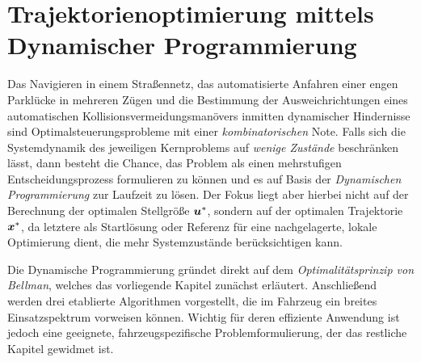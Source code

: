 
\chapter{Trajektorienoptimierung mittels Dynamischer Programmierung} \label{chap:dynamische_Optimierung_dynamisch}



Das Navigieren in einem Straßennetz, das automatisierte Anfahren einer engen Parklücke in mehreren Zügen und die Bestimmung der Ausweichrichtungen eines automatischen Kollisionsvermeidungsmanövers inmitten dynamischer Hindernisse sind Optimalsteuerungsprobleme mit einer \emph{kombinatorischen} Note. Falls sich die Systemdynamik des jeweiligen Kernproblems auf \emph{wenige Zustände} beschränken lässt, dann besteht die Chance, das Problem als einen mehrstufigen Entscheidungsprozess formulieren zu können und es auf Basis der \emph{Dynamischen Programmierung} zur Laufzeit zu lösen. Der Fokus liegt aber hierbei \iA nicht auf der Berechnung der optimalen Stellgröße $\boldsymbol{u}^\ast$, sondern auf der optimalen Trajektorie $\boldsymbol{x}^\ast$, da letztere als Startlösung oder Referenz für eine nachgelagerte, lokale Optimierung dient, die mehr Systemzustände berücksichtigen kann.

Die Dynamische Programmierung gründet direkt auf dem \emph{Optimalitätsprinzip von Bellman}, welches das vorliegende Kapitel zunächst erläutert. Anschließend werden drei etablierte Algorithmen vorgestellt, die im Fahrzeug ein breites Einsatzspektrum vorweisen können. Wichtig für deren effiziente Anwendung ist jedoch eine geeignete, fahrzeugspezifische Problemformulierung, der das restliche Kapitel gewidmet ist.

